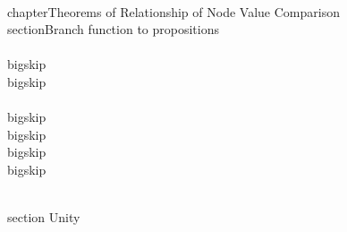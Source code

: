 
\\chapter{Theorems of Relationship of Node Value Comparison}
\\section{Branch function to propositions}
\\[,\\Bb{if(i \\Pe j)}{,\\Tc c,}{,\\Or,}, \\Rq ,i \\Pe j, \\Tc c,\\]

\\bigskip
\\bigskip
\\[,\\Bb{if(i \\Pe j)}{,\\Or,}{,\\Tc c,}, \\Rq ,i \\nPe j, \\Tc c,\\]



\\bigskip
\\bigskip
\\bigskip
\\bigskip

\\section{ Unity}
\\[, \\Rq , \\Bs{if(i \\Pe j)}{,}{,},\\]

